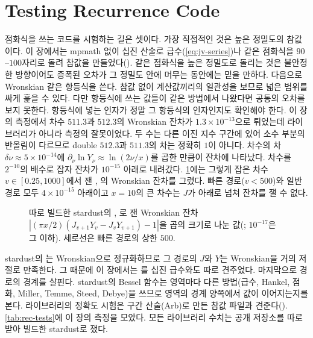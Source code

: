 \section{Testing Recurrence Code}
\label{sec:rec-testing}

점화식을 쓰는 코드를 시험하는 길은 셋이다. 가장 직접적인 것은 높은 정밀도의 참값이다. 이 장에서는 mpmath 없이 십진 산술로 급수(\cref{eq:jv-series})나 같은 점화식을 $90$--$100$자리로 돌려 참값을 만들었다(). 같은 점화식을 높은 정밀도로 돌리는 것은 불안정한 방향이어도 증폭된 오차가 그 정밀도 안에 머무는 동안에는 믿을 만하다. 다음으로 Wronskian 같은 항등식을 쓴다. 참값 없이 계산값끼리의 일관성을 보므로 넓은 범위를 싸게 훑을 수 있다. 다만 항등식에 쓰는 값들이 같은 방법에서 나왔다면 공통의 오차를 보지 못한다. 항등식에 넣는 인자가 정말 그 항등식의 인자인지도 확인해야 한다. 이 장의 측정에서 차수 $511.3$과 $512.3$의 Wronskian 잔차가 $1.3\times10^{-13}$으로 튀었는데 라이브러리가 아니라 측정의 잘못이었다. 두 수는 다른 이진 지수 구간에 있어 소수 부분의 반올림이 다르므로 double $512.3$과 $511.3$의 차는 정확히 $1$이 아니다. 차수의 차 $\delta\nu\approx5\times10^{-14}$에 $\partial_\nu\ln Y_\nu\approx\ln(2\nu/x)$를 곱한 만큼이 잔차에 나타났다. 차수를 $2^{-10}$의 배수로 잡자 잔차가 $10^{-15}$ 아래로 내려갔다. \cref{fig:wronsk}에는 그렇게 잡은 차수 $v\in[0.25,1000]$에서 잰 , 의 Wronskian 잔차를 그렸다. 빠른 경로($v<500$)와 일반 경로 모두 $4\times10^{-15}$ 아래이고 $x=10$의 큰 차수는 $J$가 아래로 넘쳐 잔차를 잴 수 없다.

\begin{figure}[htbp]
\centering
{}
\caption{따로 빌드한 stardust의 , 로 잰 Wronskian 잔차 $|(\pi x/2)(J_{v+1}Y_v-J_vY_{v+1})-1|$을 곱의 크기로 나눈 값(; $10^{-17}$은 그 이하). 세로선은 빠른 경로의 상한 $500$.}
\label{fig:wronsk}
\end{figure} stardust의 는 Wronskian으로 정규화하므로 그 경로의 $J$와 $Y$는 Wronskian을 거의 저절로 만족한다. 그 때문에 이 장에서는 를 십진 급수와도 따로 견주었다. 마지막으로 경로의 경계를 살핀다. stardust의 Bessel 함수는 영역마다 다른 방법(급수, Hankel, 점화, Miller, Temme, Steed, Debye)을 쓰므로 영역의 경계 양쪽에서 값이 이어지는지를 본다. 라이브러리의 정확도 시험은 구간 산술(Arb)로 만든 참값 파일과 견준다(). \cref{tab:rec-tests}에 이 장의 측정을 모았다. 모든 라이브러리 수치는 공개 저장소를 따로 받아 빌드한 stardust로 쟀다.

